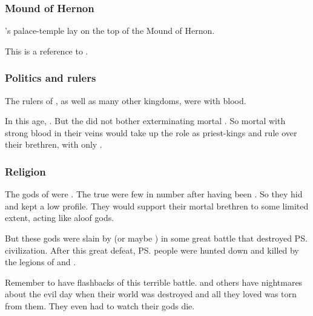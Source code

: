 \subsubsection{Mound of Hernon}
\Semiza's palace-temple lay on the top of the Mound of Hernon.

This is a reference to \cite{RHCharles:BookofEnoch}.






\subsubsection{Politics and rulers}
The rulers of \Numah, as well as many other \nephil kingdoms, were \nephilim with \aryoth blood. 

In this age, . 
But the \dragons did not bother exterminating mortal \nephilim. 
So mortal \nephilim with strong \aryoth blood in their veins would take up the role as priest-kings and rule over their brethren, with only . 





\subsubsection{Religion}
The gods of \Numah{} were . 
The true \aryothim were few in number after having been .
So they hid and kept a low profile. 
They would support their mortal brethren to some limited extent, acting like aloof gods. 

But these gods were slain by \dragons{} (or maybe \quiljaaran) in some great battle that destroyed \ps{\Numah} civilization. 
After this great defeat, \ps{\Semiza} people were hunted down and killed by the legions of \cregorrs{} and \scathae. 

Remember to have flashbacks of this terrible battle.
\Semiza{} and others have nightmares about the evil day when their world was destroyed and all they loved was torn from them. 
They even had to watch their gods die. 

